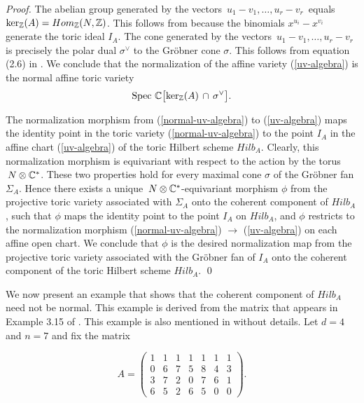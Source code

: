 \begin{proof}
The abelian group generated by the vectors
$\, u_1-v_1, \ldots, u_r-v_r \,$  equals
$\ker_{\mathbb{Z}}(A) = Hom_{\mathbb{Z}}(N,\mathbb{Z})$. This follows from 
\cite[Lemma 12.2]{HS:St1} because the
binomials $x^{u_i} - x^{v_i}$ generate the toric ideal $I_A$.
The cone generated by the vectors $\, u_1-v_1, \ldots, u_r-v_r \,$  is
precisely the polar dual $\sigma^\vee$ to
the Gr\"obner cone $\sigma$. This follows from
 equation (2.6) in \cite{HS:St1}. We conclude that the
normalization of the affine variety
(\ref{uv-algebra}) is the normal affine toric variety
\begin{equation}
\label{normal-uv-algebra}
 {\rm Spec} \,\, \mathbb{C} \bigl[
 \ker_{\mathbb{Z}}(A) \,\cap\, \sigma^\vee \bigr] .
\end{equation}

The normalization morphism from (\ref{normal-uv-algebra}) to
(\ref{uv-algebra}) maps the identity point in the  toric variety
 (\ref{normal-uv-algebra}) 
to the point $I_A$ in the affine chart 
(\ref{uv-algebra}) of the toric Hilbert 
scheme $Hilb_A$. 
Clearly, this normalization morphism is equivariant with respect to the
action by the torus $\, N \otimes \mathbb{C}^* $.
These two properties  hold for every maximal cone $\sigma$ of the 
Gr\"obner fan $\Sigma_A$. Hence there exists a unique 
$\, N \otimes \mathbb{C}^* $-equivariant morphism $\phi$
from the projective toric variety associated with $\Sigma_A$
onto the coherent component of $Hilb_A$, such that $\phi$ maps 
the identity point to the point $I_A$ on $Hilb_A$, and 
$\phi$ restricts to the normalization
morphism (\ref{normal-uv-algebra}) $\rightarrow$ (\ref{uv-algebra}) on each
affine open chart. We conclude that $\phi$
is the desired normalization map from the
projective toric variety associated with the Gr\"obner fan of $I_A$ 
onto the coherent component of the toric Hilbert scheme $Hilb_A$.
\qed
\end{proof}

We now present an example that shows that the coherent component 
of $Hilb_A$ need not be normal. This example is 
derived from the matrix that appears in Example 3.15 of \cite{HS:HM}.
This example is also mentioned in \cite{HS:PS1} without details.
Let $d=4$ and $n=7$ and fix the matrix

\begin{equation}
\label{non-normal}
A = \left( \begin{array}{ccccccc}  
1 & 1 & 1 & 1 & 1 & 1 & 1 \\
0 & 6 & 7 & 5 & 8 & 4 & 3 \\
3 & 7 & 2 & 0 & 7 & 6 & 1 \\
6 & 5 & 2 & 6 & 5 & 0 & 0 \end{array} \right).
\end{equation}

